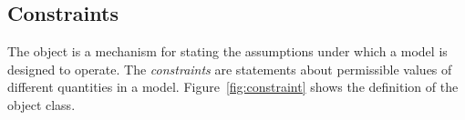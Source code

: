 %
%
%
%
%
%
%
%
%
%
%
%
%


\subsection{Constraints}
\label{sec:constraints}

The \Constraint object is a mechanism for stating the
assumptions under which a model is designed to operate.  The
\emph{constraints} are statements about permissible values of
different quantities in a model.  Figure~\vref{fig:constraint}
shows the definition of the \Constraint object class.

